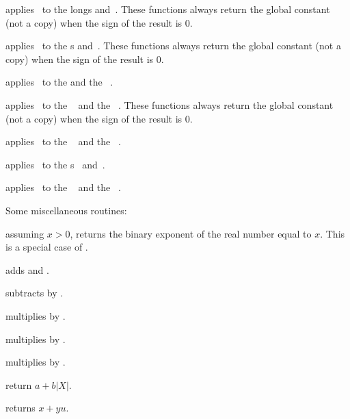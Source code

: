  applies \op\ to the longs
 and~. These functions always return the global constant
 (not a copy) when the sign of the result is $0$.

 applies \op\ to the
s  and~. These functions always return the global
constant  (not a copy) when the sign of the result is $0$.

 applies \op\ to the
  and the ~.

 applies \op\ to the
~ and the ~. These functions always return
the global constant  (not a copy) when the sign of the result
is $0$.

 applies \op\ to the
~ and the ~.

 applies \op\ to the
s~ and~.

 applies \op\ to the
~ and the ~.

\noindent Some miscellaneous routines:

 assuming $x > 0$, returns the binary exponent of
the real number equal to $x$. This is a special case of .



 adds  and .



 subtracts  by .

 multiplies  by .

 multiplies  by .

 multiplies  by .

 return $a + b|X|$.

 returns $x +yu$.

